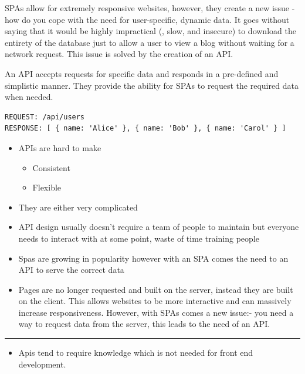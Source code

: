 \documentclass[
  12pt,
]{article}
\providecommand{\tightlist}{%
  \setlength{\itemsep}{0pt}\setlength{\parskip}{0pt}}
\begin{document}
SPAs allow for extremely responsive websites, however, they create a new
issue - how do you cope with the need for user-specific, dynamic data.
It goes without saying that it would be highly impractical (, slow, and
insecure) to download the entirety of the database just to allow a user
to view a blog without waiting for a network request. This issue is
solved by the creation of an API.

An API accepts requests for specific data and responds in a pre-defined
and simplistic manner. They provide the ability for SPAs to request the
required data when needed.

\begin{lstlisting}[caption={A mock example of an API request and it corresponding response.}]
REQUEST: /api/users
RESPONSE: [ { name: 'Alice' }, { name: 'Bob' }, { name: 'Carol' } ]
\end{lstlisting}

\begin{itemize}
\item
  APIs are hard to make

  \begin{itemize}
  \tightlist
  \item
    Consistent
  \item
    Flexible
  \end{itemize}
\item
  They are either very complicated
\item
  API design usually doesn't require a team of people to maintain but
  everyone needs to interact with at some point, waste of time training
  people
\item
  Spas are growing in popularity however with an SPA comes the need to
  an API to serve the correct data
\item
  Pages are no longer requested and built on the server, instead they
  are built on the client. This allows websites to be more interactive
  and can massively increase responsiveness. However, with SPAs comes a
  new issue:- you need a way to request data from the server, this leads
  to the need of an API.
\end{itemize}

\begin{center}\rule{0.5\linewidth}{\linethickness}\end{center}

\begin{itemize}
\tightlist
\item
  Apis tend to require knowledge which is not needed for front end
  development.
\end{itemize}
\end{document}
